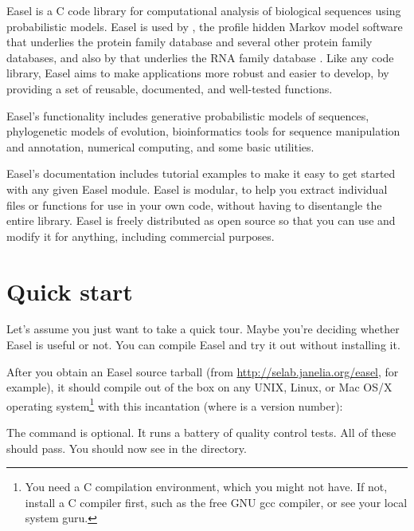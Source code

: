 

Easel is a C code library for computational analysis of biological
sequences using probabilistic models.  Easel is used by 
\citep{hmmer,Eddy98}, the profile hidden Markov model software that
underlies the  protein family database
\citep{Finn06,Sonnhammer97} and several other protein family
databases, and also by  \citep{infernal,NawrockiEddy07}
that underlies the  RNA family database
\citep{Griffiths-Jones05}. Like any code library, Easel aims to make
applications more robust and easier to develop, by providing a set of
reusable, documented, and well-tested functions.

Easel's functionality includes generative probabilistic models of
sequences, phylogenetic models of evolution, bioinformatics tools for
sequence manipulation and annotation, numerical computing, and some
basic utilities. 

Easel's documentation includes tutorial examples to make it easy to
get started with any given Easel module. Easel is modular, to help you
extract individual files or functions for use in your own code,
without having to disentangle the entire library. Easel is freely
distributed as open source so that you can use and modify it for
anything, including commercial purposes.

\section{Quick start}

Let's assume you just want to take a quick tour. Maybe you're deciding
whether Easel is useful or not. You can compile Easel and try it out
without installing it.

After you obtain an Easel source tarball (from
\url{http://selab.janelia.org/easel}, for example), it should compile
out of the box on any UNIX, Linux, or Mac OS/X operating
system\footnote{You need a C compilation environment, which you might
not have. If not, install a C compiler first, such as the free GNU gcc
compiler, or see your local system guru.} with this incantation
(where  is a version number):

\begin{cchunk}
\end{cchunk}

The  command is optional. It runs a battery of
quality control tests. All of these should pass. You should now see
 in the directory.

